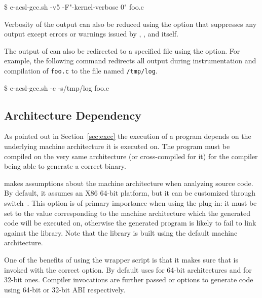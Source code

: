 \begin{frama-c-commands}
\$ e-acsl-gcc.sh -v5 -F"-kernel-verbose 0" foo.c
\end{frama-c-commands}

Verbosity of the \eacslgcc output can also be reduced using the 
option that suppresses any output except errors or warnings issued by \gcc,
\framac, and \eacslgcc itself.

The output of \eacslgcc can also be redirected to a specified file using the
 option.  For example, the following command redirects all
output during instrumentation and compilation of \texttt{foo.c} to the
file named \texttt{/tmp/log}.

\begin{frama-c-commands}
\$ e-acsl-gcc.sh -c -s/tmp/log foo.c
\end{frama-c-commands}

\subsection{Architecture Dependency}

As pointed out in Section~\ref{sec:exec} the execution of a \C program depends
on the underlying machine architecture it is executed on. The program must be
compiled on the very same architecture (or cross-compiled for it) for the
compiler being able to generate a correct binary.

\framac makes assumptions about the machine architecture when analyzing source
code.  By default, it assumes an X86 64-bit platform, but it can be customized
through  switch~\cite{userman}. This option is of primary
importance when using the \eacsl plug-in: it must be set to the value
corresponding to the machine architecture which the generated code will be
executed on, otherwise the generated program is likely to fail to link against
the \eacsl library.  Note that the library is built using the default
machine architecture.

One of the benefits of using the wrapper script is that it makes sure that
\framac is invoked with the correct  option. By default
\eacslgcc uses  for 64-bit architectures and
 for 32-bit ones. Compiler invocations are
further passed  or  options to generate code using
64-bit or 32-bit ABI respectively.


